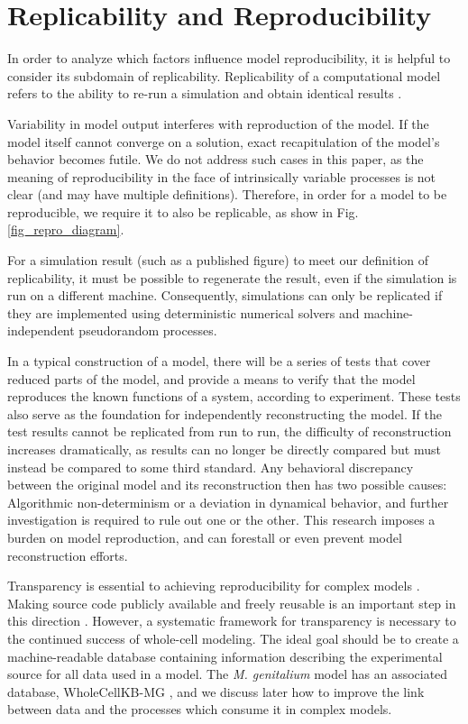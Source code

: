 \documentclass[journal,transmag,twoside]{IEEEtran}
\begin{document}
\section{Replicability and Reproducibility}

In order to analyze which factors influence model reproducibility,
it is helpful to consider its subdomain of replicability.
Replicability of a computational model refers to the ability to
re-run a simulation and obtain identical results \cite{easterbrook2014open}.

Variability in model output interferes with reproduction of the model.
If the model itself cannot converge on a solution, exact recapitulation of the model's behavior
becomes futile. %
We do not address such cases in this paper, as the meaning of reproducibility in the face
of intrinsically variable processes is not clear (and may have multiple definitions).
Therefore, in order for a model to be reproducible, we require it to also be replicable,
as show in Fig. \ref{fig_repro_diagram}.

For a simulation result (such as a published figure) to meet our definition of replicability,
it must be possible to regenerate the result,
even if the simulation is run on a different machine.
Consequently, simulations can only be replicated if they are implemented using deterministic numerical solvers and
machine-independent pseudorandom processes.

In a typical construction of a model, there will be a series of tests
that cover reduced parts of the model, and provide a means to verify
that the model reproduces the known functions of a system, according to experiment.
These tests also serve as the foundation for independently reconstructing the model.
If the test results cannot be replicated from run to run, the difficulty of reconstruction
increases dramatically, as results can no longer be directly compared but must instead
be compared to some third standard.
Any behavioral discrepancy between the original model and its reconstruction
then has two possible causes: Algorithmic non-determinism or a deviation in dynamical
behavior, and further investigation is required to rule out one or the other.
This research imposes a burden on model reproduction, and can forestall or even prevent
model reconstruction efforts.

Transparency is essential to achieving reproducibility for complex models \cite{boulton2012open}.
Making source code publicly available and freely reusable is an important step in this direction \cite{easterbrook2014open}.
However, a systematic framework for transparency is necessary to the continued success of whole-cell modeling.
The ideal goal should be to create a machine-readable database containing information describing the experimental source for all data used in a model.
The \textit{M. genitalium} model has an associated database, WholeCellKB-MG \cite{karr2013wholecellkb},
and we discuss later how to improve the link between data and the processes which consume it in complex models.
\end{document}
